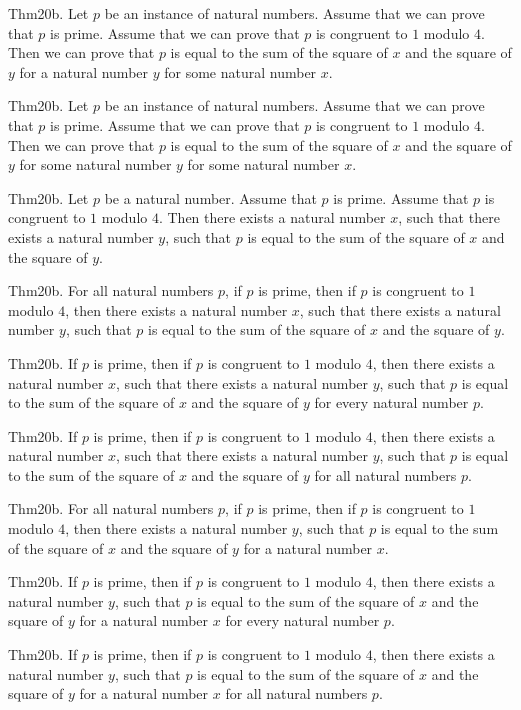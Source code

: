 \documentclass{article}
\begin{document}
Thm20b. Let $p$ be an instance of natural numbers. Assume that we can prove that $p$ is prime. Assume that we can prove that $p$ is congruent to $1$ modulo $4$. Then we can prove that $p$ is equal to the sum of the square of $x$ and the square of $y$ for a natural number $y$ for some natural number $x$.

Thm20b. Let $p$ be an instance of natural numbers. Assume that we can prove that $p$ is prime. Assume that we can prove that $p$ is congruent to $1$ modulo $4$. Then we can prove that $p$ is equal to the sum of the square of $x$ and the square of $y$ for some natural number $y$ for some natural number $x$.

Thm20b. Let $p$ be a natural number. Assume that $p$ is prime. Assume that $p$ is congruent to $1$ modulo $4$. Then there exists a natural number $x$, such that there exists a natural number $y$, such that $p$ is equal to the sum of the square of $x$ and the square of $y$.

Thm20b. For all natural numbers $p$, if $p$ is prime, then if $p$ is congruent to $1$ modulo $4$, then there exists a natural number $x$, such that there exists a natural number $y$, such that $p$ is equal to the sum of the square of $x$ and the square of $y$.

Thm20b. If $p$ is prime, then if $p$ is congruent to $1$ modulo $4$, then there exists a natural number $x$, such that there exists a natural number $y$, such that $p$ is equal to the sum of the square of $x$ and the square of $y$ for every natural number $p$.

Thm20b. If $p$ is prime, then if $p$ is congruent to $1$ modulo $4$, then there exists a natural number $x$, such that there exists a natural number $y$, such that $p$ is equal to the sum of the square of $x$ and the square of $y$ for all natural numbers $p$.

Thm20b. For all natural numbers $p$, if $p$ is prime, then if $p$ is congruent to $1$ modulo $4$, then there exists a natural number $y$, such that $p$ is equal to the sum of the square of $x$ and the square of $y$ for a natural number $x$.

Thm20b. If $p$ is prime, then if $p$ is congruent to $1$ modulo $4$, then there exists a natural number $y$, such that $p$ is equal to the sum of the square of $x$ and the square of $y$ for a natural number $x$ for every natural number $p$.

Thm20b. If $p$ is prime, then if $p$ is congruent to $1$ modulo $4$, then there exists a natural number $y$, such that $p$ is equal to the sum of the square of $x$ and the square of $y$ for a natural number $x$ for all natural numbers $p$.
\end{document}
